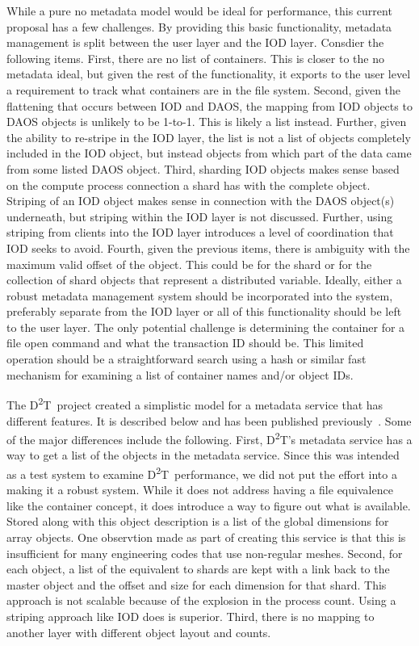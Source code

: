 \documentclass[conference]{sig-alt-gov2}
\newcommand{\DDT}{D\textsuperscript{2}T~}
\newcommand{\DDTns}{D\textsuperscript{2}T}
\begin{document}
While a pure no metadata model would be ideal for performance, this current
proposal has a few challenges. By providing this basic functionality, metadata
management is split between the user layer and the IOD layer. Consdier the
following items. First, there are no list of containers. This is closer to the
no metadata ideal, but given the rest of the functionality, it exports to the
user level a requirement to track what containers are in the file system.
Second, given the flattening that occurs between IOD and DAOS, the mapping from
IOD objects to DAOS objects is unlikely to be 1-to-1. This is likely a list
instead. Further, given the ability to re-stripe in the IOD layer, the list is
not a list of objects completely included in the IOD object, but instead
objects from which part of the data came from some listed DAOS object.  Third,
sharding IOD objects makes sense based on the compute process connection a
shard has with the complete object.  Striping of an IOD object makes sense in
connection with the DAOS object(s) underneath, but striping within the IOD
layer is not discussed. Further, using striping from clients into the IOD layer
introduces a level of coordination that IOD seeks to avoid.  Fourth, given the
previous items, there is ambiguity with the maximum valid offset of the object.
This could be for the shard or for the collection of shard objects that
represent a distributed variable. Ideally, either a robust metadata management
system should be incorporated into the system, preferably separate from the IOD
layer or all of this functionality should be left to the user layer. The only
potential challenge is determining the container for a file open command and
what the transaction ID should be. This limited operation should be a
straightforward search using a hash or similar fast mechanism for examining a
list of container names and/or object IDs.

The \DDT project created a simplistic model for a metadata service that has
different features. It is described below and has been published
previously~\cite{lofstead:2012:txn-metadata}. Some of the major differences
include the following. First, \DDTns's metadata service has a way to get a list
of the objects in the metadata service. Since this was intended as a test
system to examine \DDT performance, we did not put the effort into a making it
a robust system. While it does not address having a file equivalence like the
container concept, it does introduce a way to figure out what is available.
Stored along with this object description is a list of the global dimensions
for array objects. One observtion made as part of creating this service is that
this is insufficient for many engineering codes that use non-regular meshes.
Second, for each object, a list of the equivalent to shards are kept with a
link back to the master object and the offset and size for each dimension for
that shard. This approach is not scalable because of the explosion in the
process count. Using a striping approach like IOD does is superior. Third,
there is no mapping to another layer with different object layout and counts.
\end{document}
